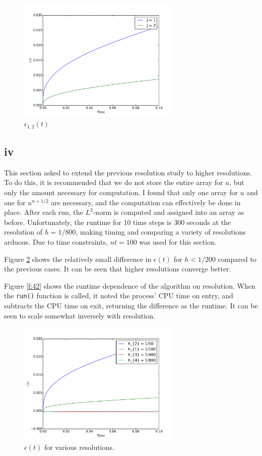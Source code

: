 \documentclass{article}
\begin{document}
\begin{figure}
  \centering
  \includegraphics[width=0.7\textwidth]{2/3/plot.pdf}
  \caption{$\epsilon_{1,2}(t)$}
  \label{f:3}
\end{figure}

\subsection*{iv}
This section asked to extend the previous resolution study to higher resolutions. To do this, it is recommended
that we do not store the entire array for $u$, but only the amount necessary for computation.
I found that only one array for $u$ and one for $u^{n+1/2}$ are necessary, and the computation
can effectively be done in place. After each run, the $L^2$-norm is computed and assigned into an array
as before. Unfortunately, the runtime for 10 time steps is 300 seconds at the resolution of $h = 1/800$,
making timing and comparing a variety of resolutions arduous. Due to time constraints, $nt=100$ was used
for this section.

Figure \ref{f:41} shows the relatively small difference in $\epsilon(t)$ for $h < 1/200$ compared to the previous
cases. It can be seen that higher resolutions converge better.

Figure \ref{f:42} shows the runtime dependence of the algorithm on resolution. When the \verb+run()+ function is
called, it noted the process' CPU time on entry, and subtracts the CPU time on exit, returning the difference as
the runtime.
It can be seen to scale somewhat inversely with resolution.


\begin{figure}
  \centering
  \includegraphics[width=0.7\textwidth]{2/4/plot.pdf}
  \caption{$\epsilon(t)$ for various resolutions.}
  \label{f:41}
\end{figure}
\end{document}
